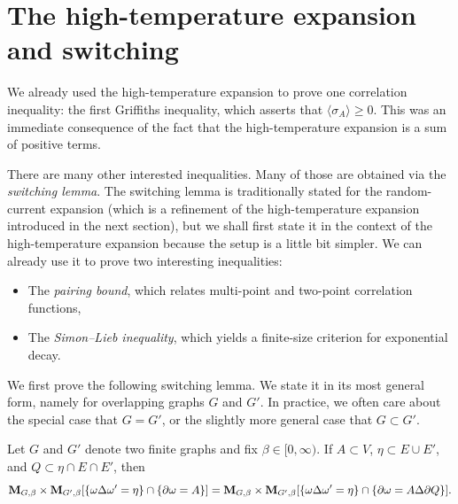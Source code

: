\section{The high-temperature expansion and switching}

We already used the high-temperature expansion to prove one correlation inequality:
the first Griffiths inequality, which asserts that $\langle\sigma_A\rangle\geq 0$.
This was an immediate consequence of the fact that the high-temperature expansion is a
sum of positive terms.

There are many other interested inequalities.
Many of those are obtained via the \emph{switching lemma}.
The switching lemma is traditionally stated for the random-current expansion
(which is a refinement of the high-temperature expansion introduced in the next section),
but we shall first state it in the context of the high-temperature expansion
because the setup is a little bit simpler.
We can already use it to prove two interesting inequalities:
\begin{itemize}
    \item The \emph{pairing bound}, which relates multi-point and two-point correlation functions,
    \item The \emph{Simon--Lieb inequality}, which yields a finite-size criterion for
        exponential decay.
\end{itemize}

We first prove the following switching lemma.
We state it in its most general form,
namely for overlapping graphs $G$ and $G'$.
In practice, we often care about the special case that $G=G'$, or the slightly more general
case that $G\subset G'$.

\begin{lemma}
    \label{lemma:switching_high_t}
    Let $G$ and $G'$ denote two finite graphs and fix $\beta\in[0,\infty)$.
    If $A\subset V$, $\eta\subset E\cup E'$, and $Q\subset \eta\cap E\cap E'$,
    then
    \begin{equation}
        \mathbf{M}_{G,\beta}\times\mathbf{M}_{G',\beta}
        [\{\omega\Delta\omega'=\eta\}\cap \{\partial\omega=A\}]
        =
        \mathbf{M}_{G,\beta}\times\mathbf{M}_{G',\beta}
        [\{\omega\Delta\omega'=\eta\}\cap \{\partial\omega= A\Delta\partial Q\}].
    \end{equation}
\end{lemma}

